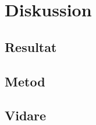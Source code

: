 \section{Diskussion}
\label{sec:bjorn-discussion}



\subsection{Resultat}
\label{subsec:bjorn-discussion-results}



\subsection{Metod}
\label{subsec:bjorn-discussion-method}


\subsection{Vidare}
\label{subsec:bjorn-discussion-future}